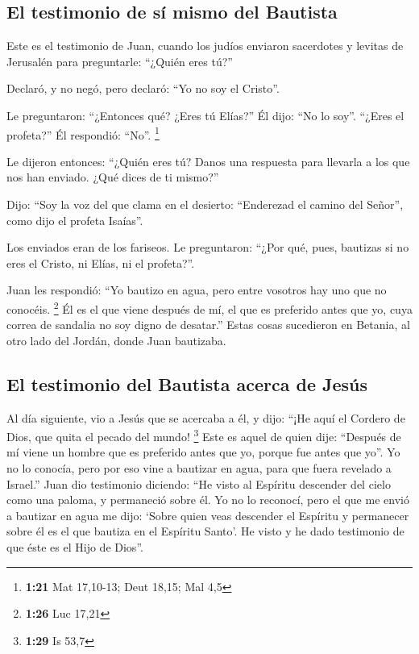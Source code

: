 \begin{paracol}{2}
\hypertarget{el-testimonio-de-suxed-mismo-del-bautista}{%
\subsection{El testimonio de sí mismo del
Bautista}\label{el-testimonio-de-suxed-mismo-del-bautista}}

 Este es el testimonio de Juan, cuando los judíos
enviaron sacerdotes y levitas de Jerusalén para preguntarle: ``¿Quién
eres tú?''

 Declaró, y no negó, pero declaró: ``Yo no soy el
Cristo''.

 Le preguntaron: ``¿Entonces qué? ¿Eres tú Elías?'' Él
dijo: ``No lo soy''. ``¿Eres el profeta?'' Él respondió: ``No''.
\footnote{\textbf{1:21} Mat 17,10-13; Deut 18,15; Mal 4,5}

 Le dijeron entonces: ``¿Quién eres tú? Danos una
respuesta para llevarla a los que nos han enviado. ¿Qué dices de ti
mismo?''

 Dijo: ``Soy la voz del que clama en el desierto:
``Enderezad el camino del Señor'', como dijo el profeta Isaías''.

 Los enviados eran de los fariseos.  Le
preguntaron: ``¿Por qué, pues, bautizas si no eres el Cristo, ni Elías,
ni el profeta?''.

 Juan les respondió: ``Yo bautizo en agua, pero entre
vosotros hay uno que no conocéis. \footnote{\textbf{1:26} Luc 17,21}
 Él es el que viene después de mí, el que es preferido
antes que yo, cuya correa de sandalia no soy digno de desatar.''
 Estas cosas sucedieron en Betania, al otro lado del
Jordán, donde Juan bautizaba.

\hypertarget{el-testimonio-del-bautista-acerca-de-jesuxfas}{%
\subsection{El testimonio del Bautista acerca de
Jesús}\label{el-testimonio-del-bautista-acerca-de-jesuxfas}}

 Al día siguiente, vio a Jesús que se acercaba a él, y
dijo: ``¡He aquí el Cordero de Dios, que quita el pecado del mundo!
\footnote{\textbf{1:29} Is 53,7}  Este es aquel de quien
dije: ``Después de mí viene un hombre que es preferido antes que yo,
porque fue antes que yo''.  Yo no lo conocía, pero por
eso vine a bautizar en agua, para que fuera revelado a Israel.''
 Juan dio testimonio diciendo: ``He visto al Espíritu
descender del cielo como una paloma, y permaneció sobre él.
 Yo no lo reconocí, pero el que me envió a bautizar en
agua me dijo: `Sobre quien veas descender el Espíritu y permanecer sobre
él es el que bautiza en el Espíritu Santo'.  He visto y
he dado testimonio de que éste es el Hijo de Dios''.


\end{paracol}
